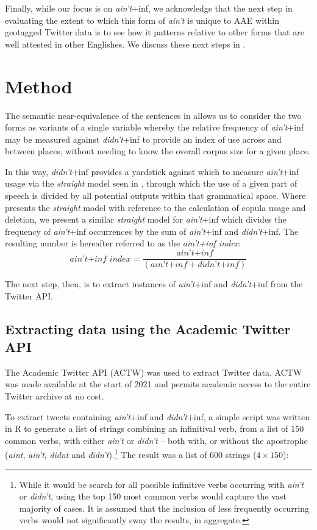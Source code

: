 \documentclass[output=paper,colorlinks,citecolor=brown,draftmode]{langscibook}
\begin{document}
Finally, while our focus is on \textit{ain't}+inf, we acknowledge that the next step in evaluating the extent to which this form of \textit{ain’t} is unique to AAE within geotagged Twitter data is to see how it patterns relative to other forms that are well attested in other Englishes. We discuss these next steps in .

\section{Method}
The semantic near-equivalence of the sentences in  allows us to consider the two forms as variants of a single variable \citep{labov1968a,wolfram2016a,fisher2022} whereby the relative frequency of \textit{ain't}+inf may be measured against \textit{didn't}+inf to provide an index of use across and between places, without needing to know the overall corpus size for a given place. 

In this way, \textit{didn't}+inf provides a yardstick against which to measure \textit{ain't}+inf usage via the \textit{straight} model seen in \citet{rickford1991}, through which the use of a given part of speech is divided by all potential outputs within that grammatical space.  Where \citet{rickford1991} presents the \textit{straight} model with reference to the calculation of copula usage and deletion, we present a similar \textit{straight} model for \textit{ain't}+inf which divides the frequency of \textit{ain't}+inf occurrences by the sum of \textit{ain't}+inf and \textit{didn't}+inf. The resulting number is hereafter referred to as the \textit{ain't+inf index}:
\[\textit{ain't+inf index} = \frac{\textit{ain't+inf}}{(\textit{ain't+inf}+\textit{didn't+inf})} \]

The next step, then, is to extract instances of  \textit{ain't}+inf and \textit{didn't}+inf from the Twitter API.

\subsection{Extracting data using the Academic Twitter API}
The Academic Twitter API (ACTW) was used to extract Twitter data. ACTW was made available at the start of 2021 and permits academic access to the entire Twitter archive at no cost. 

To extract tweets containing \textit{ain't}+inf and \textit{didn't}+inf, a simple script was written in R to generate a list of strings combining an infinitival verb, from a list of 150 common verbs, with either \textit{ain’t} or \textit{didn’t} -- both with, or without the apostrophe (\textit{aint}, \textit{ain’t}, \textit{didnt} and \textit{didn’t}).\footnote{While it would be search for all possible infinitive verbs occurring with \textit{ain't} or \textit{didn't}, using the top 150 most common verbs would capture the vast majority of cases. It is assumed that the inclusion of less frequently occurring verbs would not significantly sway the results, in aggregate.} The result was a list of 600 strings ($4\times 150$):
\end{document}

